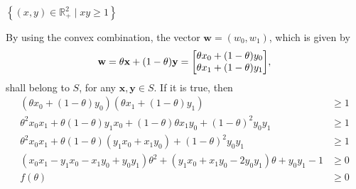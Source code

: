 \documentclass[12pt,a4paper]{article}
\begin{document}



\subproblem  \(\left\{ (x,y) \in \mathbb{R}_{+}^{2} \mid xy \geq 1 \right\}\)

By using the convex combination, the vector \(\mathbf{w} = (w_0, w_1)\), which is given by
\begin{align}
    \mathbf{w} = \theta \mathbf{x} + (1-\theta)\mathbf{y} = \mqty[\theta x_0 + (1 - \theta)y_0 \\ \theta x_1 + (1 - \theta)y_1],
\end{align}
shall belong to \(S\), for any \(\mathbf{x}, \mathbf{y} \in S\). If it is true, then
\begin{align}
    (\theta x_0 + (1 - \theta)y_0)(\theta x_1 + (1 - \theta)y_1) & \geq 1\\
    \theta^2 x_0 x_1 + \theta(1 - \theta)y_1 x_0 + (1 - \theta)\theta x_1 y_0 + (1 - \theta)^2 y_0 y_1 & \geq 1\\
    \theta^2 x_0 x_1 + \theta(1 - \theta)(y_1 x_0 + x_1 y_0) + (1 - \theta)^2 y_0 y_1 & \geq 1 \\
    (x_0 x_1 - y_1 x_0 - x_1 y_0 + y_0 y_1 )\theta^2 + (y_1 x_0 + x_1 y_0 - 2y_0 y_1) \theta + y_0 y_1 - 1 & \geq 0 \\
    f(\theta)& \geq 0
\end{align}
\end{document}
